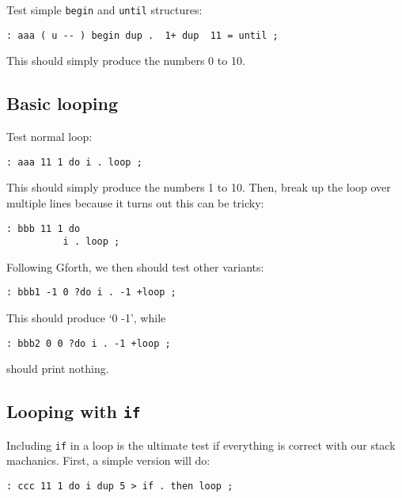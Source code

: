 Test simple \texttt{begin} and
\texttt{until} structures:

\begin{lstlisting}[frame=lines]
        : aaa ( u -- ) begin dup .  1+ dup  11 = until ;
\end{lstlisting}

\noindent This should simply produce the numbers 0 to 10.


\subsection{Basic looping}

Test normal loop:
\begin{lstlisting}[frame=lines]
        : aaa 11 1 do i . loop ;        
\end{lstlisting}

\noindent This should simply produce the numbers 1 to 10. Then, break up the
loop over multiple lines because it turns out this can be tricky:

\begin{lstlisting}[frame=lines]
        : bbb 11 1 do 
          i . loop ; 
\end{lstlisting}

\noindent Following Gforth, we then should test other variants:

\begin{lstlisting}[frame=lines]
        : bbb1 -1 0 ?do i . -1 +loop ;
\end{lstlisting}

\noindent This should produce `0 -1', while

\begin{lstlisting}[frame=lines]
        : bbb2 0 0 ?do i . -1 +loop ;
\end{lstlisting}

\noindent should print nothing.


\subsection{Looping with \texttt{if}}

Including \texttt{if} in a loop is the ultimate test if everything is correct
with our stack machanics. First, a simple version will do:

\begin{lstlisting}[frame=lines]
        : ccc 11 1 do i dup 5 > if . then loop ; 
\end{lstlisting}

